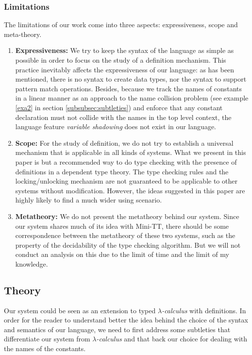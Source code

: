 \documentclass{article}
\theoremstyle{remark}
\begin{document}
\subsubsection{Limitations}
The limitations of our work come into three aspects: expressiveness, scope and meta-theory.
\begin{enumerate}
\item \textbf{Expressiveness:} We try to keep the syntax of the language as simple as possible in order to focus on the study of a definition mechanism. This practice inevitably affects the expressiveness of our language: as has been mentioned, there is no syntax to create data types, nor the syntax to support pattern match operations. Besides, because we track the names of constants in a linear manner as an approach to the name collision problem (see example \ref{exa2} in section \ref{subsubsec:subtleties}) and enforce that any constant declaration must not collide with the names in the top level context, the language feature \emph{variable shadowing} does not exist in our language.
\item \textbf{Scope:} For the study of definition, we do not try to establish a universal mechanism that is applicable in all kinds of systems. What we present in this paper is but a recommended way to do type checking with the presence of definitions in a dependent type theory. The type checking rules and the locking/unlocking mechanism are not guaranteed to be applicable to other systems without modification. However, the ideas suggested in this paper are highly likely to find a much wider using scenario. 
\item \textbf{Metatheory:} We do not present the metatheory behind our system. Since our system shares much of its idea with Mini-TT, there should be some correspondence between the metatheory of these two systems, such as the property of the decidability of the type checking algorithm. But we will not conduct an analysis on this due to the limit of time and the limit of my knowledge.
\end{enumerate}

\subsection{Theory}
Our system could be seen as an extension to typed \emph{$\lambda$-calculus} with definitions. In order for the reader to understand better the idea behind the choice of the syntax and semantics of our language, we need to first address some subtleties that differentiate our system from \emph{$\lambda$-calculus} and that back our choice for dealing with the names of the constants.
\end{document}
